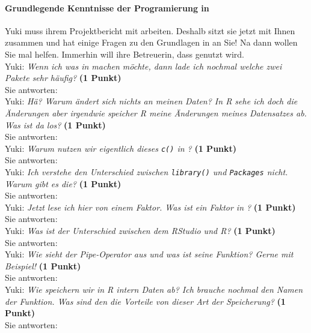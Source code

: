 \documentclass[a4paper, 9pt]{scrartcl}\usepackage[]{graphicx}\usepackage[]{xcolor}
\begin{document}
\paragraph{Grundlegende Kenntnisse der Programierung in \Rlogo}

Yuki muss ihrem Projektbericht mit \Rlogo arbeiten. Deshalb sitzt sie jetzt mit Ihnen zusammen und hat einige Fragen zu den Grundlagen in \Rlogo an Sie! Na dann wollen Sie mal helfen. Immerhin will ihre Betreuerin, dass \Rlogo genutzt wird.\\[1Ex]

Yuki: \textit{Wenn ich was in \Rlogo machen möchte, dann lade ich nochmal welche zwei \Rlogo Pakete sehr häufig?} \textbf{(1 Punkt)}\\[1ex]
Sie antworten:\\[2Ex]

Yuki: \textit{Hä? Warum ändert sich nichts an meinen Daten? In R sehe ich doch die Änderungen aber irgendwie speicher R meine Änderungen meines Datensatzes ab. Was ist da los?} \textbf{(1 Punkt)}\\[1ex]
Sie antworten:\\[2Ex]

Yuki: \textit{Warum nutzen wir eigentlich dieses \texttt{c()} in \Rlogo?} \textbf{(1 Punkt)}\\[1ex]
Sie antworten:\\[2Ex]

Yuki: \textit{Ich verstehe den Unterschied zwischen \texttt{library()} und \texttt{Packages} nicht. Warum gibt es die?} \textbf{(1 Punkt)}\\[1ex]
Sie antworten:\\[2Ex]

Yuki: \textit{Jetzt lese ich hier von einem Faktor. Was ist ein Faktor in \Rlogo?} \textbf{(1 Punkt)}\\[1ex]
Sie antworten:\\[2Ex]

Yuki: \textit{Was ist der Unterschied zwischen dem RStudio und R?} \textbf{(1 Punkt)}\\[1ex]
Sie antworten:\\[2Ex]

Yuki: \textit{Wie sieht der Pipe-Operator aus und was ist seine Funktion? Gerne mit Beispiel!} \textbf{(1 Punkt)}\\[1ex]
Sie antworten:\\[2Ex]

Yuki: \textit{Wie speichern wir in R intern Daten ab? Ich brauche nochmal den Namen der Funktion. Was sind den die Vorteile von dieser Art der Speicherung?} \textbf{(1 Punkt)}\\[1ex]
Sie antworten:\\[2Ex]
\end{document}
